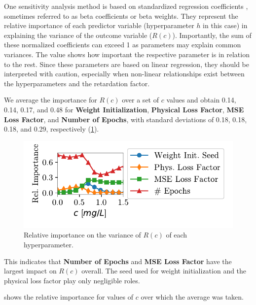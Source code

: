 One sensitivity analysis method is based on standardized regression coefficients \cite{menard2004standardized}, sometimes referred to as beta coefficients or beta weights. They represent the relative importance of each predictor variable (hyperparameter $h$ in this case) in explaining the variance of the outcome variable ($R(c)$).
Importantly, the sum of these normalized coefficients can exceed 1 as parameters may explain common variances. The value shows how important the respective parameter is in relation to the rest.
Since these parameters are based on linear regression, they should be interpreted with caution, especially when non-linear relationships exist between the hyperparameters and the retardation factor.

We average the importance for $R(c)$ over a set of $c$ values and obtain 0.14, 0.14, 0.17, and 0.48 for \textbf{Weight Initialization}, \textbf{Physical Loss Factor}, \textbf{MSE Loss Factor}, and \textbf{Number of Epochs}, with standard deviations of 0.18, 0.18, 0.18, and 0.29, respectively (\cref{fig:sensitivity_per_dimension}).

\begin{figure}[h]
    \centering
    \includegraphics{figs/sensitivity.pdf}
    \caption{Relative importance on the variance of $R(c)$ of each hyperparameter.}
    \label{fig:sensitivity_per_dimension}
\end{figure}

This indicates that \textbf{Number of Epochs} and \textbf{MSE Loss Factor} have the largest impact on $R(c)$ overall. The seed used for weight initialization and the physical loss factor play only negligible roles.

 shows the relative importance for values of $c$ over which the average was taken.

